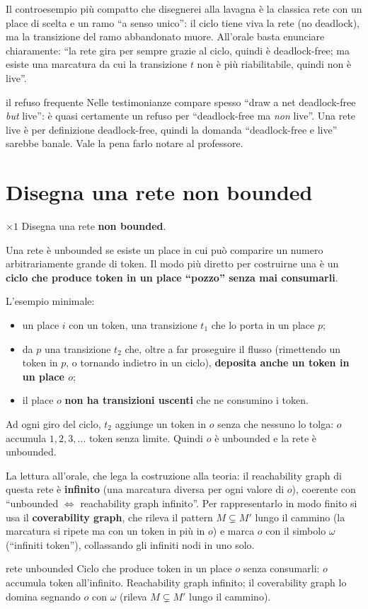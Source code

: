 Il controesempio più compatto che disegnerei alla lavagna è la classica rete con un place di scelta e un ramo ``a senso unico'': il ciclo tiene viva la rete (no deadlock), ma la transizione del ramo abbandonato muore. All'orale basta enunciare chiaramente: ``la rete gira per sempre grazie al ciclo, quindi è deadlock-free; ma esiste una marcatura da cui la transizione $t$ non è più riabilitabile, quindi non è live''.

\begin{attenzione}{il refuso frequente}
Nelle testimonianze compare spesso ``draw a net deadlock-free \emph{but} live'': è quasi certamente un refuso per ``deadlock-free ma \emph{non} live''. Una rete live è per definizione deadlock-free, quindi la domanda ``deadlock-free e live'' sarebbe banale. Vale la pena farlo notare al professore.
\end{attenzione}

\section{Disegna una rete non bounded}

\begin{domanda}{$\times 1$}
Disegna una rete \textbf{non bounded}.
\end{domanda}

Una rete è unbounded se esiste un place in cui può comparire un numero arbitrariamente grande di token. Il modo più diretto per costruirne una è un \textbf{ciclo che produce token in un place ``pozzo'' senza mai consumarli}.

L'esempio minimale:
\begin{itemize}
  \item un place $i$ con un token, una transizione $t_1$ che lo porta in un place $p$;
  \item da $p$ una transizione $t_2$ che, oltre a far proseguire il flusso (rimettendo un token in $p$, o tornando indietro in un ciclo), \textbf{deposita anche un token in un place $o$};
  \item il place $o$ \textbf{non ha transizioni uscenti} che ne consumino i token.
\end{itemize}

Ad ogni giro del ciclo, $t_2$ aggiunge un token in $o$ senza che nessuno lo tolga: $o$ accumula $1, 2, 3, \dots$ token senza limite. Quindi $o$ è unbounded e la rete è unbounded.

La lettura all'orale, che lega la costruzione alla teoria: il reachability graph di questa rete è \textbf{infinito} (una marcatura diversa per ogni valore di $o$), coerente con ``unbounded $\iff$ reachability graph infinito''. Per rappresentarlo in modo finito si usa il \textbf{coverability graph}, che rileva il pattern $M \subsetneq M'$ lungo il cammino (la marcatura si ripete ma con un token in più in $o$) e marca $o$ con il simbolo $\omega$ (``infiniti token''), collassando gli infiniti nodi in uno solo.

\begin{puntochiave}{rete unbounded}
Ciclo che produce token in un place $o$ senza consumarli: $o$ accumula token all'infinito. Reachability graph infinito; il coverability graph lo domina segnando $o$ con $\omega$ (rileva $M\subsetneq M'$ lungo il cammino).
\end{puntochiave}
